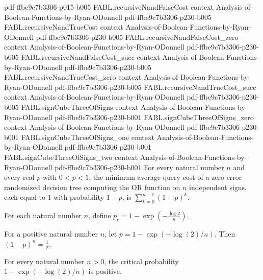 \begin{theorem}
  {pdf-ffbe9c7b3306-p015-b005}
\proofstep
  {FABL.recursiveNandFalseCost}
  {context}
  {Analysis-of-Boolean-Functions-by-Ryan-ODonnell}
  {pdf-ffbe9c7b3306-p230-b005}
\proofstep
  {FABL.recursiveNandTrueCost}
  {context}
  {Analysis-of-Boolean-Functions-by-Ryan-ODonnell}
  {pdf-ffbe9c7b3306-p230-b005}
\proofstep
  {FABL.recursiveNandFalseCost_zero}
  {context}
  {Analysis-of-Boolean-Functions-by-Ryan-ODonnell}
  {pdf-ffbe9c7b3306-p230-b005}
\proofstep
  {FABL.recursiveNandFalseCost_succ}
  {context}
  {Analysis-of-Boolean-Functions-by-Ryan-ODonnell}
  {pdf-ffbe9c7b3306-p230-b005}
\proofstep
  {FABL.recursiveNandTrueCost_zero}
  {context}
  {Analysis-of-Boolean-Functions-by-Ryan-ODonnell}
  {pdf-ffbe9c7b3306-p230-b005}
\proofstep
  {FABL.recursiveNandTrueCost_succ}
  {context}
  {Analysis-of-Boolean-Functions-by-Ryan-ODonnell}
  {pdf-ffbe9c7b3306-p230-b005}
\proofstep
  {FABL.signCubeThreeOfSigns}
  {context}
  {Analysis-of-Boolean-Functions-by-Ryan-ODonnell}
  {pdf-ffbe9c7b3306-p230-b001}
\proofstep
  {FABL.signCubeThreeOfSigns_zero}
  {context}
  {Analysis-of-Boolean-Functions-by-Ryan-ODonnell}
  {pdf-ffbe9c7b3306-p230-b001}
\proofstep
  {FABL.signCubeThreeOfSigns_one}
  {context}
  {Analysis-of-Boolean-Functions-by-Ryan-ODonnell}
  {pdf-ffbe9c7b3306-p230-b001}
\proofstep
  {FABL.signCubeThreeOfSigns_two}
  {context}
  {Analysis-of-Boolean-Functions-by-Ryan-ODonnell}
  {pdf-ffbe9c7b3306-p230-b001}
For every natural number $n$ and every real $p$ with $0<p<1$, the minimum average query
cost of a zero-error randomized decision tree computing the OR function on $n$
independent signs, each equal to $1$ with probability $1-p$, is
$\sum_{k=0}^{n-1}(1-p)^k$.
\end{theorem}

\begin{definition}
\label{FABL.orCriticalProbability}
\leanok
For each natural number $n$, define $p_c=1-\exp\!\left(-\frac{\log 2}{n}\right)$.
\end{definition}

\begin{theorem}
\label{FABL.one_sub_orCriticalProbability_pow}
\leanok
{}
For a positive natural number $n$, let $p=1-\exp(-\log(2)/n)$. Then $(1-p)^n=\tfrac12$.
\end{theorem}

\begin{theorem}
\label{FABL.orCriticalProbability_pos}
\leanok
{}
For every natural number $n>0$, the critical probability $1-\exp(-\log(2)/n)$ is
positive.
\end{theorem}

